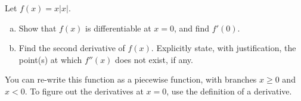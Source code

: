 \begin{Mquestion}[2007H]
Let $f(x) = x|x|$.
\begin{enumerate}[(a)]
\item\label{s2.14_2007_1} Show that
$f(x)$ is differentiable at $x = 0$, and find $f'(0)$.
\item\label{s2.14_2007_2} Find the second derivative of $f(x)$. Explicitly state,
with justification, the point(s) at which $f''(x)$ does not exist, if any.
\end{enumerate}
\end{Mquestion}
\begin{hint} You can re-write this function as a piecewise function, with branches $x \ge 0$ and $x<0$. To figure out the derivatives at $x = 0$, use
          the definition of a derivative.
\end{hint}
